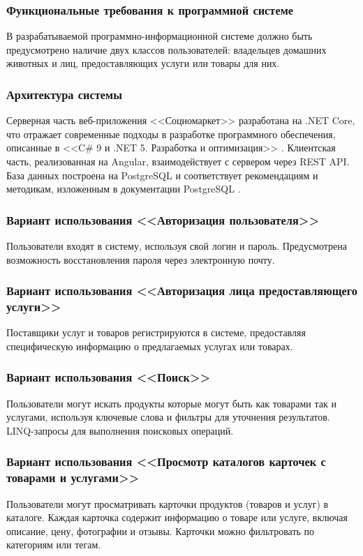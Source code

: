 \subsubsection{Функциональные требования к программной системе}
В разрабатываемой программно-информационной системе должно быть предусмотрено наличие двух классов пользователей: владельцев домашних животных и лиц, предоставляющих услуги или товары для них.

\subsubsection{Архитектура системы} 
Серверная часть веб-приложения <<Социомаркет>> разработана на .NET Core, что отражает современные подходы в разработке программного обеспечения, описанные в <<C\# 9 и .NET 5. Разработка и оптимизация>> \cite{mark_price}. Клиентская часть, реализованная на Angular, взаимодействует с сервером через REST API. База данных построена на PostgreSQL и соответствует рекомендациям и методикам, изложенным в документации PostgreSQL \cite{postgresql}.

\subsubsection{Вариант использования <<Авторизация пользователя>>} 
Пользователи входят в систему, используя свой логин и пароль. Предусмотрена возможность восстановления пароля через электронную почту.

\subsubsection{Вариант использования <<Авторизация лица предоставляющего услуги>>}
Поставщики услуг и товаров регистрируются в системе, предоставляя специфическую информацию о предлагаемых услугах или товарах.

\subsubsection{Вариант использования <<Поиск>>} 
Пользователи могут искать продукты которые могут быть как товарами так и услугами, используя ключевые слова и фильтры для уточнения результатов. LINQ-запросы для выполнения поисковых операций.

\subsubsection{Вариант использования <<Просмотр каталогов карточек с товарами и услугами>>}
Пользователи могут просматривать карточки продуктов (товаров и услуг) в каталоге. Каждая карточка содержит информацию о товаре или услуге, включая описание, цену, фотографии и отзывы. Карточки можно фильтровать по категориям или тегам.

